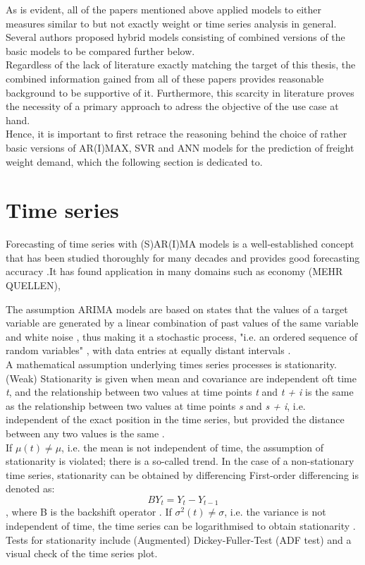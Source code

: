 \documentclass[a4paper, 11pt]{article}
\begin{document}
As is evident, all of the papers mentioned above applied models to either measures similar to but not exactly weight or time series analysis in general. Several authors proposed hybrid models consisting of combined versions of the basic models to be compared further below. \\
Regardless of the lack of literature exactly matching the target of this thesis, the combined information gained from all of these papers provides reasonable background to be supportive of it. Furthermore, this scarcity in literature proves the necessity of a primary approach to adress the objective of the use case at hand.\\
Hence, it is important to first retrace the reasoning behind the choice of rather basic versions of AR(I)MAX, SVR and ANN models for the prediction of freight weight demand, which the following section is dedicated to.\\

\section{Time series}
Forecasting of time series with (S)AR(I)MA models is a well-established concept that has been studied thoroughly for many decades and provides good forecasting accuracy \citep{Arlt.2017, Khandelwal.2015}.It has found application in many domains such as economy (MEHR QUELLEN), 

The assumption ARIMA models are based on states that the values of a target variable are generated by a linear combination of past values of the same variable and white noise \citep{Khandelwal.2015}, thus making it a stochastic process, "i.e. an ordered sequence of random variables" \citep{Andreoni.2006b}, with data entries at equally distant intervals \citep{Hunt.2003}.\\
A mathematical assumption underlying times series processes is stationarity.
(Weak) Stationarity is given when mean and covariance are independent oft time \textit{t}, and the relationship between two values at time points \textit{t} and \textit{t + i} is the same as the relationship between two values at time points \textit{s} and \textit{s + i}, i.e. independent of the exact position in the time series, but provided the distance between any two values is the same \citep{Vogel.2015}.\\
If $\mu(t) \neq \mu$, i.e. the mean is not independent of time, the assumption of stationarity is violated; there is a so-called trend. In the case of a non-stationary time series, stationarity can be obtained by differencing \citep{Andreoni.2006b, Hunt.2003}
First-order differencing is denoted as:
\begin{equation}
	BY_{t} = Y_{t} - Y_{t-1}
\end{equation}
, where B is the backshift operator \citep{Hunt.2003}.
If $\sigma^2(t) \neq \sigma$, i.e. the variance is not independent of time, the time series can be logarithmised to obtain stationarity \citep{Andreoni.2006b}.
Tests for stationarity include (Augmented) Dickey-Fuller-Test (ADF test) \citep{Zhao.07022018} and a visual check of the time series plot. 
\end{document}
